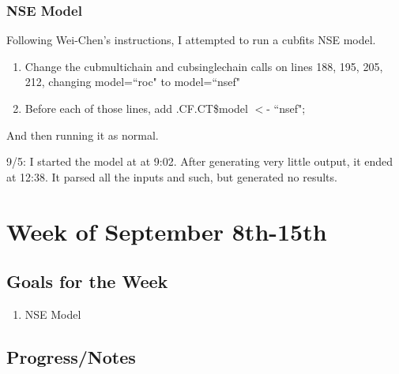 \subsubsection{NSE Model}
Following Wei-Chen's instructions, I attempted to run a cubfits NSE model.
\begin{enumerate}
\item Change the cubmultichain and cubsinglechain calls on lines 188, 195, 205, 212, changing model=``roc" to model=``nsef"
\item Before each of those lines, add .CF.CT\$model $<$- ``nsef";
\end{enumerate}
And then running it as normal.


9/5: I started the model at at 9:02. After generating very little output, it ended at 12:38. It parsed all the inputs and such, but generated no results.


\section{Week of September 8th-15th}
\subsection{Goals for the Week}

\begin{enumerate}
\item NSE Model

\end{enumerate}

\subsection{Progress/Notes}

